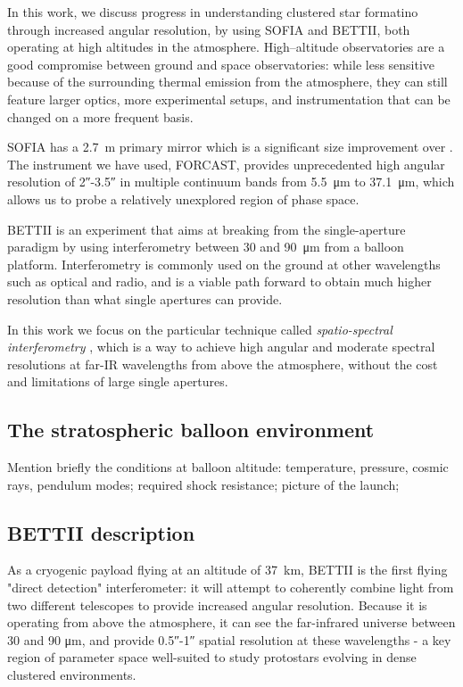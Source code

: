 In this work, we discuss progress in understanding clustered star formatino through increased angular resolution, by using SOFIA and BETTII, both operating at high altitudes in the atmosphere. High--altitude observatories are a good compromise between ground and space observatories: while less sensitive because of the surrounding thermal emission from the atmosphere, they can still feature larger optics, more experimental setups, and instrumentation that can be changed on a more frequent basis.

SOFIA has a \SI{2.7}{\meter} primary mirror which is a significant size improvement over \Spitzer. The instrument we have used, FORCAST, provides unprecedented high angular resolution of \ang{;;2}-\ang{;;3.5} in multiple continuum bands from \SI{5.5}{\micro\meter} to \SI{37.1}{\micro\meter}, which allows us to probe a relatively unexplored region of phase space.

BETTII is an experiment that aims at breaking from the single-aperture paradigm by using interferometry between 30 and \SI{90}{\micro\meter} from a balloon platform. Interferometry is commonly used on the ground at other wavelengths such as optical and radio, and is a viable path forward to obtain much higher resolution than what single apertures can provide. 

In this work we focus on the particular technique called \textit{spatio-spectral interferometry} \citep{Mariotti:1988vea}, which is a way to achieve 
high angular and moderate spectral resolutions at far-IR wavelengths from above the atmosphere, without the cost and limitations of large single apertures. 


\subsection{The stratospheric balloon environment}

Mention briefly the conditions at balloon altitude: temperature, pressure, cosmic rays, pendulum modes; required shock resistance; picture of the launch; 


\subsection{BETTII description}

As a cryogenic payload flying at an altitude of \SI{37}{\kilo\meter}, BETTII is the first flying "direct detection" interferometer: it will attempt to coherently combine light from two different telescopes to provide increased angular resolution. Because it is operating from above the atmosphere, it can see the far-infrared universe between 30 and 90 \si{\micro\meter}, and provide \ang{;;0.5}-\ang{;;1} spatial resolution at these wavelengths - a key region of parameter space well-suited to study protostars evolving in dense clustered environments.

